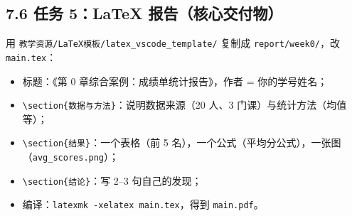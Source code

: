 \begin{Shaded}
\begin{Highlighting}[]
\NormalTok{)   }

\OperatorTok{=}\NormalTok{ [r[}\NormalTok{] }\NormalTok{ rows]}
\OperatorTok{=}\NormalTok{ [r[}\NormalTok{] }\NormalTok{ rows]}
\OperatorTok{=}\NormalTok{(}\NormalTok{, }\NormalTok{))}
\OperatorTok{=}\OperatorTok{=}\OperatorTok{=}\NormalTok{)}
\NormalTok{)}\OperatorTok{;}\NormalTok{)}\OperatorTok{;}\NormalTok{)}
\OperatorTok{=}\NormalTok{)}
\NormalTok{(}\NormalTok{)}
\end{Highlighting}
\end{Shaded}

\subsection{7.6 任务 5：LaTeX
报告（核心交付物）}\label{ux4efbux52a1-5latex-ux62a5ux544aux6838ux5fc3ux4ea4ux4ed8ux7269}

用 \texttt{教学资源/LaTeX模板/latex\_vscode\_template/} 复制成
\texttt{report/week0/}，改 \texttt{main.tex}：

\begin{itemize}
\tightlist
\item
  标题：《第 0 章综合案例：成绩单统计报告》，作者 = 你的学号姓名；
\item
  \texttt{\textbackslash{}section\{数据与方法\}}：说明数据来源（20 人、3
  门课）与统计方法（均值等）；
\item
  \texttt{\textbackslash{}section\{结果\}}：一个表格（前 5
  名），一个公式（平均分公式），一张图（\texttt{avg\_scores.png}）；
\item
  \texttt{\textbackslash{}section\{结论\}}：写 2--3 句自己的发现；
\item
  编译：\texttt{latexmk\ -xelatex\ main.tex}，得到 \texttt{main.pdf}。
\end{itemize}

